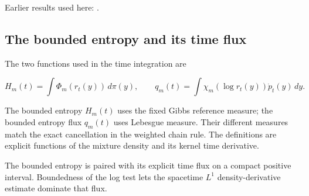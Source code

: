 \documentclass[11pt,a4paper]{report}
\begin{document}
Earlier results used here: \cite[Section~3.26.3]{LangevinLean2026ULASC}.
\subsection{\texorpdfstring{The bounded entropy and its time flux}{The bounded entropy and its time flux}}
\label{report-step-UnadjustedLangevin-LSI-GaussianEntropyIdentity-lean-8}


The two functions used in the time integration are

\[H_m(t)=\int\Phi_m(r_t(y))\,d\pi(y),\qquad q_m(t)=\int\chi_m(\log r_t(y))\dot p_t(y)\,dy.\]

The bounded entropy \(H_m(t)\) uses the fixed Gibbs reference measure; the bounded entropy flux \(q_m(t)\) uses Lebesgue measure. Their different measures match the exact cancellation in the weighted chain rule. The definitions are explicit functions of the mixture density and its kernel time derivative.



The bounded entropy is paired with its explicit time flux on a compact positive interval. Boundedness of the log test lets the spacetime \(L^1\) density-derivative estimate dominate that flux.
\end{document}
